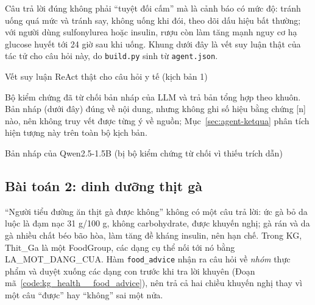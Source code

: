 

Câu trả lời đúng không phải ``tuyệt đối cấm'' mà là cảnh báo có mức độ: tránh uống quá mức và tránh say, không
uống khi đói, theo dõi dấu hiệu bất thường; với người dùng sulfonylurea hoặc insulin, rượu còn làm tăng mạnh nguy cơ
hạ glucose huyết tới 24 giờ sau khi uống. Khung dưới đây là vết suy luận thật của tác tử cho câu hỏi này, do
\texttt{build.py} sinh từ \texttt{agent.json}.

\begin{vetsuyluan}{Vết suy luận ReAct thật cho câu hỏi y tế (kịch bản 1)}

\end{vetsuyluan}

Bộ kiểm chứng đã từ chối bản nháp của LLM và trả bản tổng hợp theo khuôn. Bản nháp (dưới đây) đúng về nội dung,
nhưng không ghi số hiệu bằng chứng [n] nào, nên không truy vết được từng ý về nguồn; Mục~\ref{sec:agent-ketqua}
phân tích hiện tượng này trên toàn bộ kịch bản.

\begin{vetsuyluan}{Bản nháp của Qwen2.5-1.5B (bị bộ kiểm chứng từ chối vì thiếu trích dẫn)}

\end{vetsuyluan}

\subsection{Bài toán 2: dinh dưỡng thịt gà}
``Người tiểu đường ăn thịt gà được không'' không có một câu trả lời: ức gà bỏ da luộc là đạm nạc 31 g/100 g, không
carbohydrate, được khuyến nghị; gà rán và da gà nhiều chất béo bão hòa, làm tăng đề kháng insulin, nên hạn chế.
Trong KG, \textsf{Thit\_Ga} là một \textsf{FoodGroup}, các dạng cụ thể nối tới nó bằng \textsf{LA\_MOT\_DANG\_CUA}.
Hàm \texttt{food\_advice} nhận ra câu hỏi về \emph{nhóm} thực phẩm và duyệt xuống các dạng con trước khi tra lời
khuyên (Đoạn mã~\ref{code:kg_health__food_advice}), nên trả cả hai chiều khuyến nghị thay vì một câu ``được'' hay
``không'' sai một nửa.


